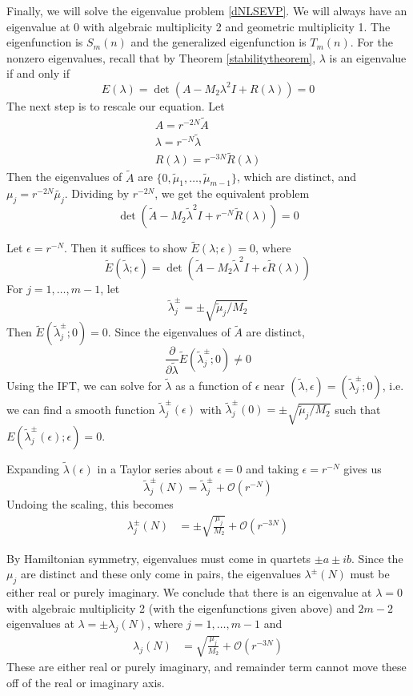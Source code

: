 \documentclass[12pt]{article}
\begin{document}
Finally, we will solve the eigenvalue problem \eqref{dNLSEVP}. We will always have an eigenvalue at 0 with algebraic multiplicity 2 and geometric multiplicity 1. The eigenfunction is $S_m(n)$ and the generalized eigenfunction is $T_m(n)$. For the nonzero eigenvalues, recall that by Theorem \ref{stabilitytheorem}, $\lambda$ is an eigenvalue if and only if 
\[
E(\lambda) = \det(A - M_2 \lambda^2 I + R(\lambda) ) = 0
\]
The next step is to rescale our equation. Let
\begin{align*}
A = r^{-2N} \tilde{A} \\
\lambda = r^{-N} \tilde{\lambda} \\
R(\lambda) = r^{-3N} \tilde{R}(\lambda)
\end{align*}
Then the eigenvalues of $\tilde{A}$ are $\{0, \tilde{\mu}_1, \dots, \tilde{\mu}_{m-1}\}$, which are distinct, and $\mu_j = r^{-2N} \tilde{\mu_j}$. Dividing by $r^{-2N}$, we get the equivalent problem
\[
\det(\tilde{A} - M_2 \tilde{\lambda}^2 I + r^{-N} \tilde{R}(\lambda)) = 0
\]

Let $\epsilon = r^{-N}$. Then it suffices to show $\tilde{E}(\lambda; \epsilon) = 0$, where
\[
\tilde{E}(\tilde{\lambda}; \epsilon) = \det(\tilde{A} - M_2 \tilde{\lambda}^2 I + \epsilon \tilde{R}(\lambda))
\]
For $j = 1, \dots, m-1$, let 
\[
\tilde{\lambda}_j^\pm = \pm \sqrt{\tilde{\mu}_j / M_2 }
\]
Then $\tilde{E}(\tilde{\lambda}_j^\pm; 0) = 0$. Since the eigenvalues of $\tilde{A}$ are distinct,
\[
\frac{\partial}{\partial \tilde{\lambda}} \tilde{E}(\tilde{\lambda}_j^\pm; 0) \neq 0
\]
Using the IFT, we can solve for $\tilde{\lambda}$ as a function of $\epsilon$ near $(\tilde{\lambda}, \epsilon) = (\tilde{\lambda}_j^\pm; 0)$, i.e. we can find a smooth function $\tilde{\lambda}_j^\pm(\epsilon)$ with $\tilde{\lambda}_j^\pm(0) = \pm \sqrt{\tilde{\mu}_j / M_2 }$ such that $E(\tilde{\lambda}_j^\pm(\epsilon); \epsilon) = 0$.

Expanding $\tilde{\lambda}(\epsilon)$ in a Taylor series about $\epsilon = 0$ and taking $\epsilon = r^{-N}$ gives us
\begin{equation*}
\tilde{\lambda}_j^\pm(N) = \tilde{\lambda}_j^\pm + \mathcal{O}(r^{-N})
\end{equation*}
Undoing the scaling, this becomes
\begin{align*}
\lambda^\pm_j(N) &= \pm \sqrt{\frac{\mu_j}{M_2}} + \mathcal{O}(r^{-3N}) 
\end{align*}

By Hamiltonian symmetry, eigenvalues must come in quartets $\pm a \pm i b$. Since the $\mu_j$ are distinct and these only come in pairs, the eigenvalues $\lambda^\pm(N)$ must be either real or purely imaginary. We conclude that there is an eigenvalue at $\lambda = 0$ with algebraic multiplicity 2 (with the eigenfunctions given above) and $2m - 2$ eigenvalues at $\lambda = \pm \lambda_j(N)$, where $j = 1, \dots, m-1$ and 
\begin{align*}
\lambda_j(N) &= \sqrt{\frac{\mu_j}{M_2}} + \mathcal{O}(r^{-3N}) 
\end{align*}
These are either real or purely imaginary, and remainder term cannot move these off of the real or imaginary axis.
\end{document}
